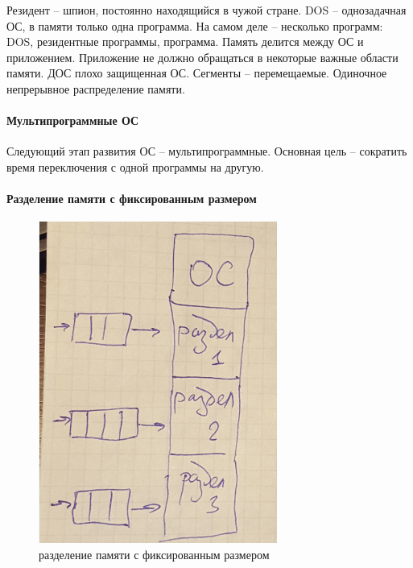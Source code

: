 Резидент – шпион, постоянно находящийся в чужой стране.  DOS – однозадачная ОС, в памяти только одна программа. На самом деле – несколько программ: DOS, резидентные программы, программа. Память делится между ОС и приложением. Приложение не должно обращаться в некоторые важные области памяти. ДОС плохо защищенная ОС. Сегменты – перемещаемые. Одиночное непрерывное распределение памяти.

\paragraph{Мультипрограммные ОС}
Следующий этап развития ОС – мультипрограммные. Основная цель – сократить время переключения с одной программы на другую. 

\paragraph{Разделение памяти с фиксированным размером}

\begin{figure}[H]
	\centering
	\includegraphics[width=\textwidth]{pic/7.png}
	\caption{разделение памяти с фиксированным размером}
\end{figure}


